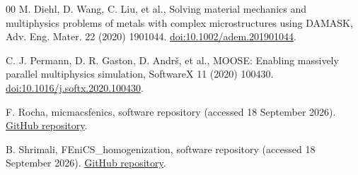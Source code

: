 \documentclass[preprint,12pt]{elsarticle}
\begin{document}
\begin{thebibliography}{00}
M. Diehl, D. Wang, C. Liu, et al., Solving material mechanics and multiphysics
problems of metals with complex microstructures using DAMASK, Adv. Eng. Mater.
22 (2020) 1901044. \href{https://doi.org/10.1002/adem.201901044}{doi:10.1002/adem.201901044}.

C. J. Permann, D. R. Gaston, D. Andr\v{s}, et al., MOOSE: Enabling massively
parallel multiphysics simulation, SoftwareX 11 (2020) 100430.
\href{https://doi.org/10.1016/j.softx.2020.100430}{doi:10.1016/j.softx.2020.100430}.

F. Rocha, micmacsfenics, software repository (accessed 18 September 2026).
\href{https://github.com/felipefr/micmacsfenics}{GitHub repository}.

B. Shrimali, FEniCS\_homogenization, software repository
(accessed 18 September 2026).
\href{https://github.com/bhaveshshrimali/FEniCS_homogenization}{GitHub repository}.

\end{thebibliography}
\end{document}
